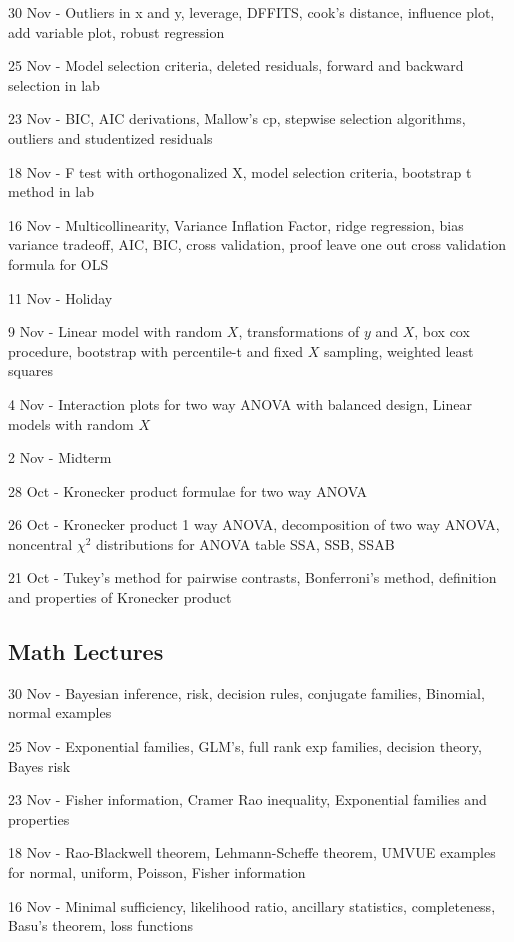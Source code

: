 \documentclass[10pt, twocolumn]{article}
\begin{document}
30 Nov - Outliers in x and y, leverage, DFFITS, cook's distance, influence
plot, add variable plot, robust regression

25 Nov - Model selection criteria, deleted residuals, forward and backward
selection in lab

23 Nov - BIC, AIC derivations, Mallow's cp, stepwise selection algorithms,
outliers and studentized residuals

18 Nov - F test with orthogonalized X, model selection criteria,
bootstrap t method in lab

16 Nov - Multicollinearity, Variance Inflation Factor,
ridge regression, bias variance tradeoff, AIC, BIC, cross validation, proof leave
one out cross validation formula for OLS 

11 Nov - Holiday

9 Nov - Linear model with random $X$, transformations of $y$ and $X$, box
cox procedure, bootstrap with percentile-t and fixed $X$ sampling, weighted
least squares

4 Nov - Interaction plots for two way ANOVA with balanced design, Linear
models with random $X$

2 Nov - Midterm

28 Oct - Kronecker product formulae for two way ANOVA

26 Oct - Kronecker product 1 way ANOVA, decomposition of two way ANOVA,
noncentral $\chi^2$ distributions for ANOVA table SSA, SSB, SSAB

21 Oct - Tukey's method for pairwise contrasts, Bonferroni's method,
definition and properties of Kronecker product

\subsection{Math Lectures}

30 Nov - Bayesian inference, risk, decision rules, conjugate families,
Binomial, normal examples

25 Nov - Exponential families, GLM's, full rank exp families, decision
theory, Bayes risk

23 Nov - Fisher information, Cramer Rao inequality, Exponential families
and properties

18 Nov - Rao-Blackwell theorem, Lehmann-Scheffe theorem, UMVUE examples for
normal, uniform, Poisson, Fisher information

16 Nov - Minimal sufficiency, likelihood ratio, ancillary statistics,
completeness, Basu's theorem, loss functions
\end{document}
